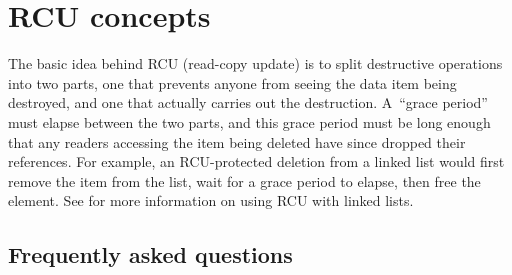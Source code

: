 \section{RCU concepts}
\label{sec:rcu:RCU concepts}

The basic idea behind RCU (read-copy update) is to split destructive
operations into two parts, one that prevents anyone from seeing the data
item being destroyed, and one that actually carries out the destruction.
A~``grace period'' must elapse between the two parts, and this grace period
must be long enough that any readers accessing the item being deleted have
since dropped their references.
For example, an RCU-protected deletion
from a linked list would first remove the item from the list, wait for
a grace period to elapse, then free the element.
See  for more
information on using RCU with linked lists.

\subsection{Frequently asked questions}
\label{sec:rcu:Frequently asked questions}

